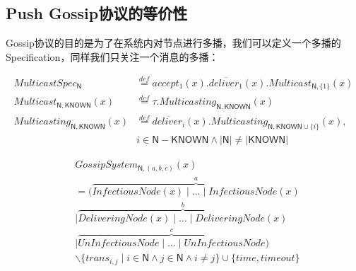 \subsection{Push Gossip协议的等价性}

Gossip协议的目的是为了在系统内对节点进行多播，我们可以定义一个多播的Specification，同样我们只关注一个消息的多播：
\begin{definition} 
\begin{align*}
    MulticastSpec_\mathsf{N}&\stackrel{def}{=}accept_1(x).\overline{deliver_1}(x).Multicast_{\mathsf{N},\{1\}}(x)\\
    Multicast_{\mathsf{N},\mathsf{KNOWN}}(x)&\stackrel{def}{=}\tau.Multicasting_{\mathsf{N},\mathsf{KNOWN}}(x)\\
    Multicasting_{\mathsf{N},\mathsf{KNOWN}}(x)&\stackrel{def}{=}\overline{deliver_i}(x).Multicasting_{\mathsf{N},\mathsf{KNOWN}\cup\{i\}}(x), \\
    &i\in \mathsf{N}-\mathsf{KNOWN} \wedge |\mathsf{N}|\neq |\mathsf{KNOWN}|
 \end{align*}
\end{definition} 

 \begin{definition} 
    \begin{align*}
   &GossipSystem_{\mathsf{N},(a,b,c)}(x)\\
   &= (\stackrel{a}{\overbrace{InfectiousNode(x)\mid \dots \mid InfectiousNode(x)}}\\
   &\mid \stackrel{b}{\overbrace{DeliveringNode(x)\mid \dots\mid DeliveringNode(x)}}\\
   &\mid \stackrel{c}{\overbrace{UnInfectiousNode\mid \dots \mid UnInfectiousNode}})\\
   &\backslash \{trans_{i,j}\mid i\in \mathsf{N} \wedge j\in \mathsf{N} \wedge i\neq j\}\cup \{time, timeout\}
\end{align*}
 \end{definition} 

